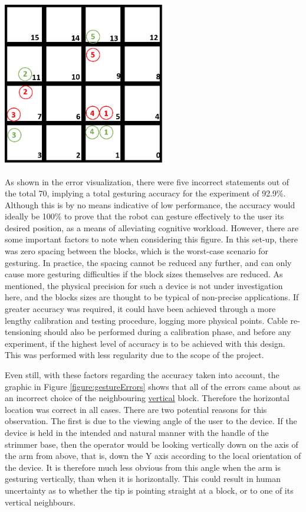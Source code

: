 \documentclass[11pt]{article}
\begin{document}
\begin{center}
\includegraphics[width=0.55\textwidth]{images/gestureErrors.png}
\label{figure:gestureErrors}
\end{center}

As shown in the error visualization, there were five incorrect statements out of the total 70, implying a total gesturing accuracy for the experiment of 92.9\%. Although this is by no means indicative of low performance, the accuracy would ideally be 100\% to prove that the robot can gesture effectively to the user its desired position, as a means of alleviating cognitive workload. However, there are some important factors to note when considering this figure. In this set-up, there was zero spacing between the blocks, which is the worst-case scenario for gesturing. In practice, the spacing cannot be reduced any further, and can only cause more gesturing difficulties if the block sizes themselves are reduced. As mentioned, the physical precision for such a device is not under investigation here, and the blocks sizes are thought to be typical of non-precise applications. If greater accuracy was required, it could have been achieved through a more lengthy calibration and testing procedure, logging more physical points. Cable re-tensioning should also be performed during a calibration phase, and before any experiment, if the highest level of accuracy is to be achieved with this design. This was performed with less regularity due to the scope of the project.

Even still, with these factors regarding the accuracy taken into account, the graphic in Figure \ref{figure:gestureErrors} shows that all of the errors came about as an incorrect choice of the neighbouring \underline{vertical} block. Therefore the horizontal location was correct in all cases. There are two potential reasons for this observation. The first is due to the viewing angle of the user to the device. If the device is held in the intended and natural manner with the handle of the strimmer base, then the operator would be looking vertically down on the axis of the arm from above, that is, down the Y axis according to the local orientation of the device. It is therefore much less obvious from this angle when the arm is gesturing vertically, than when it is horizontally. This could result in human uncertainty as to whether the tip is pointing straight at a block, or to one of its vertical neighbours. 
\end{document}
